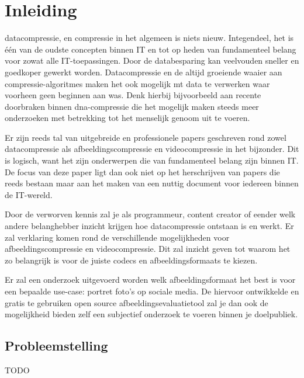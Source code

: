 
\chapter{Inleiding}
\label{ch:inleiding}

\Gls{datacompressie}, en compressie in het algemeen is niets nieuw. Integendeel, het is één van de oudste concepten binnen IT en tot op heden van fundamenteel belang voor zowat alle IT-toepassingen. Door de databesparing kan veelvouden sneller en goedkoper gewerkt worden. Datacompressie en de altijd groeiende waaier aan \glspl{compressie-algoritme} maken het ook mogelijk mt data te verwerken waar voorheen geen beginnen aan was. Denk hierbij bijvoorbeeld aan recente doorbraken binnen \gls{dna-compressie} die het mogelijk maken steeds meer onderzoeken met betrekking tot het menselijk genoom uit te voeren.

Er zijn reeds tal van uitgebreide en professionele papers geschreven rond zowel \gls{datacompressie} als \gls{afbeeldingscompressie} en \gls{videocompressie} in het bijzonder. Dit is logisch, want het zijn onderwerpen die van fundamenteel belang zijn binnen IT. De focus van deze paper ligt dan ook niet op het herschrijven van papers die reeds bestaan maar aan het maken van een nuttig document voor iedereen binnen de IT-wereld. 

Door de verworven kennis zal je als programmeur, content creator of eender welk andere belanghebber inzicht krijgen hoe \gls{datacompressie} ontstaan is en werkt. Er zal verklaring komen rond de verschillende mogelijkheden voor \gls{afbeeldingscompressie} en \gls{videocompressie}. Dit zal inzicht geven tot waarom het zo belangrijk is voor de juiste \glspl{codec} en \glspl{afbeeldingsformaat} te kiezen.

Er zal een onderzoek uitgevoerd worden welk \gls{afbeeldingsformaat} het best is voor een bepaalde \gls{use-case}: portret foto's op sociale media. De hiervoor ontwikkelde en gratis te gebruiken open source  \gls{afbeeldingsevaluatietool} zal je dan ook de mogelijkheid bieden zelf een subjectief onderzoek te voeren binnen je doelpubliek.




\section{Probleemstelling}
\label{sec:probleemstelling}
TODO

